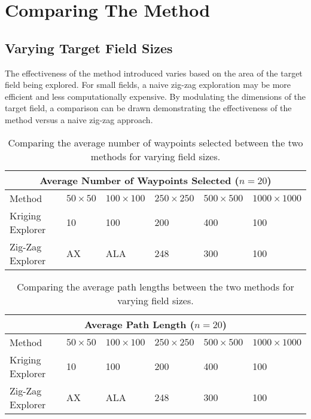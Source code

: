 \section{Comparing The Method}

\subsection{Varying Target Field Sizes}
The effectiveness of the method introduced varies based on the area of the target field being explored. For small fields, a naive zig-zag exploration may be more efficient and less computationally expensive. By modulating the dimensions of the target field, a comparison can be drawn demonstrating the effectiveness of the method versus a naive zig-zag approach.

\begin{table}
\centering
	\begin{tabular}{ |p{3cm}||p{1.5cm}|p{1.5cm}|p{1.5cm}|p{1.5cm}|p{2cm}|  }
		\hline
		\multicolumn{6}{|c|}{Average Number of Waypoints Selected ($n=20$)} \\
		\hline
		Method & $50 \times 50$ & $100 \times 100$ & $250 \times 250$ & $500 \times 500$ & $1000 \times 1000$ \\
		\hline
		Kriging Explorer   	& 10 & 100 & 200 & 400 & 100 \\
		Zig-Zag Explorer	& AX & ALA & 248 & 300 & 100 \\
		\hline
	\end{tabular}
	\caption{Comparing the average number of waypoints selected between the two methods for varying field sizes.}
    \label{tab:path_wps}
\end{table}

\begin{table}
\centering
	\begin{tabular}{ |p{3cm}||p{1.5cm}|p{1.5cm}|p{1.5cm}|p{1.5cm}|p{2cm}|  }
		\hline
		\multicolumn{6}{|c|}{Average Path Length ($n=20$)} \\
		\hline
		Method & $50 \times 50$ & $100 \times 100$ & $250 \times 250$ & $500 \times 500$ & $1000 \times 1000$ \\
		\hline
		Kriging Explorer   	& 10 & 100 & 200 & 400 & 100 \\
		Zig-Zag Explorer	& AX & ALA & 248 & 300 & 100 \\
		\hline
	\end{tabular}
	\caption{Comparing the average path lengths between the two methods for varying field sizes.}
    \label{tab:path_lengths}
\end{table}

